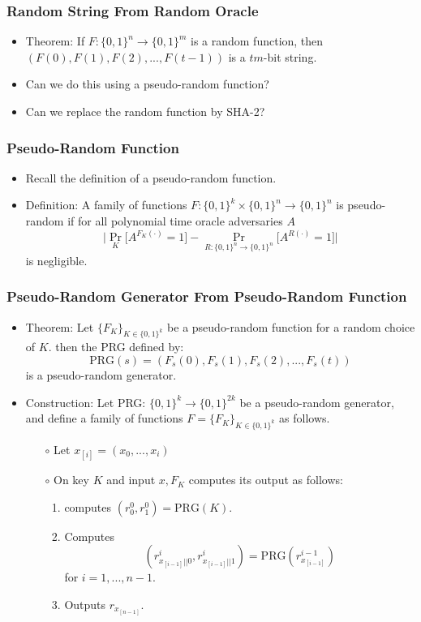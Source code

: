 \documentclass[a4paper]{scrartcl}
\begin{document}
\subsubsection*{Random String From Random Oracle}

\begin{itemize}
\item Theorem: If $F: \{0,1\}^n \rightarrow \{0,1\}^m$ is a random function, then $(F(0),F(1),F(2),...,F(t-1))$ is a $tm$-bit string.
\item Can we do this using a pseudo-random function?
\item Can we replace the random function by SHA-2?
\end{itemize}

\subsubsection*{Pseudo-Random Function}

\begin{itemize}
\item Recall the definition of a pseudo-random function.
\item Definition: A family of functions $F: \{0,1\}^k \times \{0,1\}^n \rightarrow \{0,1\}^n$ is pseudo-random if for all polynomial time oracle adversaries $A$
$$\Bigg|\Pr_{K} \Big[A^{F_K(\cdot)}=1 \Big] - \Pr_{R:\{0,1\}^n\rightarrow\{0,1\}^n} \Big[A^{R(\cdot)}=1\Big] \Bigg|$$ is negligible.
\end{itemize}

\subsubsection*{Pseudo-Random Generator From Pseudo-Random Function}

\begin{itemize}
\item Theorem: Let $\{F_K\}_{K \in \{0,1\}^k}$ be a pseudo-random function for a random choice of $K$. then the PRG defined by:
$$\text{PRG}(s) = (F_s(0),F_s(1),F_s(2),...,F_s(t))$$ is a pseudo-random generator.
\item Construction: Let PRG: $\{0,1\}^k \rightarrow \{0,1\}^{2k}$ be a pseudo-random generator, and define a family of functions $F = \{F_K\}_{K \in \{0,1\}^k}$ as follows.
\begin{itemize}
\item [$\circ$] Let $x_{[i]} = (x_0,...,x_i)$
\item [$\circ$] On key $K$ and input $x, F_K$ computes its output as follows:
\begin{enumerate}
\item computes $(r_0^0,r_1^0) = \text{PRG}(K)$.
\item Computes $$(r^i_{x_{[i-1]}||0},r^i_{x_{[i-1]}||1}) = \text{PRG}(r^{i-1}_{x_{[i-1]}})$$ for $i = 1,...,n-1$.
\item Outputs $r_{x_{[n-1]}}$.
\end{enumerate}
\end{itemize}
\end{itemize}
\end{document}
